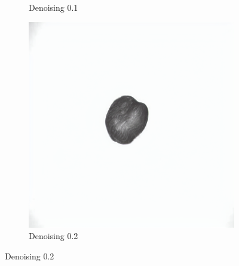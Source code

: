 \documentclass[12pt,DIV14,BCOR12mm,a4paper,footinclude=false,headinclude,parskip=half-,twoside,openright,cleardoublepage=empty,toc=index,bibliography=totoc,listof=totoc]{scrreprt}
\numberwithin{equation}{chapter}
\begin{document}
\begin{figure}
\begin{subfigure}{0.14\textwidth}
        \caption{Denoising 0.1}
    \end{subfigure}
    \begin{subfigure}{0.14\textwidth}
        \centering
        \includegraphics[width=\linewidth]{../media/image_0.2.png} %
        \caption{Denoising 0.2}
    \end{subfigure}
    

\end{figure}
\end{document}

